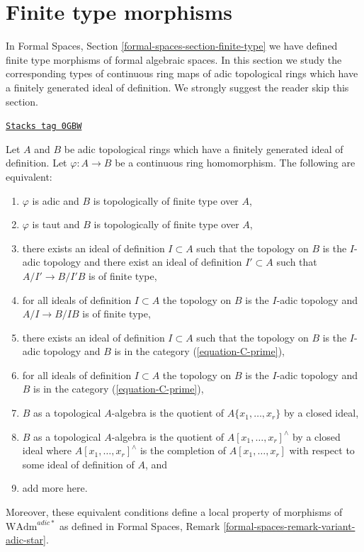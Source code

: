 \section{Finite type morphisms}
\label{restricted-section-finite-type}
In Formal Spaces, Section \ref{formal-spaces-section-finite-type}
we have defined finite type morphisms of formal algebraic spaces.
In this section we study the corresponding types of continuous
ring maps of adic topological rings which have a finitely generated
ideal of definition. We strongly suggest the reader skip this section.

\begin{lemma}
\label{restricted-lemma-finite-type}
\href{https://stacks.math.columbia.edu/tag/0GBW}{\texttt{Stacks tag 0GBW}}

Let $A$ and $B$ be adic topological rings which have a finitely generated
ideal of definition. Let $\varphi : A \to B$ be a continuous ring homomorphism.
The following are equivalent:
\begin{enumerate}
\item $\varphi$ is adic and $B$ is topologically of finite type over $A$,
\item $\varphi$ is taut and $B$ is topologically of finite type over $A$,
\item there exists an ideal of definition $I \subset A$ such that
the topology on $B$ is the $I$-adic topology and there exist an ideal
of definition $I' \subset A$ such that $A/I' \to B/I'B$ is of finite type,
\item for all ideals of definition $I \subset A$ the topology on $B$
is the $I$-adic topology and $A/I \to B/IB$ is of finite type,
\item there exists an ideal of definition $I \subset A$ such that
the topology on $B$ is the $I$-adic topology and $B$ is in the category
(\ref{equation-C-prime}),
\item for all ideals of definition $I \subset A$ the topology on $B$
is the $I$-adic topology and $B$ is in the category (\ref{equation-C-prime}),
\item $B$ as a topological $A$-algebra is the quotient of
$A\{x_1, \ldots, x_r\}$ by a closed ideal,
\item $B$ as a topological $A$-algebra is the quotient of
$A[x_1, \ldots, x_r]^\wedge$ by a closed ideal where
$A[x_1, \ldots, x_r]^\wedge$ is the completion of $A[x_1, \ldots, x_r]$
with respect to some ideal of definition of $A$, and
\item add more here.
\end{enumerate}
Moreover, these equivalent conditions define
a local property of morphisms of $\text{WAdm}^{adic*}$ as defined in
Formal Spaces, Remark \ref{formal-spaces-remark-variant-adic-star}.
\end{lemma}

